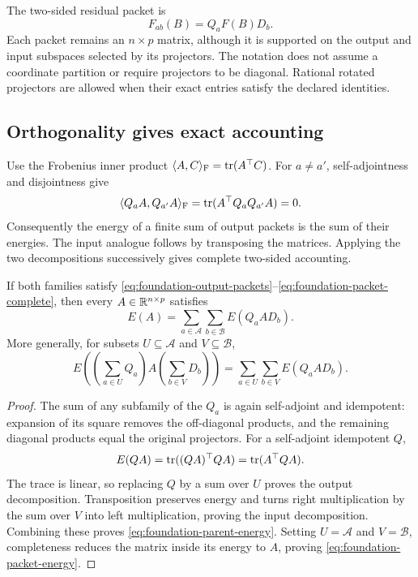 The two-sided residual packet is
\begin{equation}
 F_{ab}(B)=Q_aF(B)D_b.
 \label{eq:foundation-packet-residual}
\end{equation}
Each packet remains an $n\times p$ matrix, although it is supported on the output and input subspaces selected by its projectors. The notation does not assume a coordinate partition or require projectors to be diagonal. Rational rotated projectors are allowed when their exact entries satisfy the declared identities.

\subsection{Orthogonality gives exact accounting}

Use the Frobenius inner product $\langle A,C\rangle_{\mathrm F}=\operatorname{tr}(A^\top C)$. For $a\ne a'$, self-adjointness and disjointness give
\[
 \langle Q_aA,Q_{a'}A\rangle_{\mathrm F}
 =\operatorname{tr}(A^\top Q_aQ_{a'}A)=0.
\]
Consequently the energy of a finite sum of output packets is the sum of their energies. The input analogue follows by transposing the matrices. Applying the two decompositions successively gives complete two-sided accounting.

\begin{theorem}
\label{thm:foundation-packet-energy}
If both families satisfy \eqref{eq:foundation-output-packets}--\eqref{eq:foundation-packet-complete}, then every $A\in\mathbb R^{n\times p}$ satisfies
\begin{equation}
 E(A)=\sum_{a\in\mathcal A}\sum_{b\in\mathcal B}E(Q_aAD_b).
 \label{eq:foundation-packet-energy}
\end{equation}
More generally, for subsets $U\subseteq\mathcal A$ and $V\subseteq\mathcal B$,
\begin{equation}
 E\!\left(\left(\sum_{a\in U}Q_a\right)A
             \left(\sum_{b\in V}D_b\right)\right)
 =\sum_{a\in U}\sum_{b\in V}E(Q_aAD_b).
 \label{eq:foundation-parent-energy}
\end{equation}
\end{theorem}
\begin{proof}
The sum of any subfamily of the $Q_a$ is again self-adjoint and idempotent: expansion of its square removes the off-diagonal products, and the remaining diagonal products equal the original projectors. For a self-adjoint idempotent $Q$,
\[
 E(QA)=\operatorname{tr}((QA)^\top QA)=\operatorname{tr}(A^\top QA).
\]
The trace is linear, so replacing $Q$ by a sum over $U$ proves the output decomposition. Transposition preserves energy and turns right multiplication by the sum over $V$ into left multiplication, proving the input decomposition. Combining these proves \eqref{eq:foundation-parent-energy}. Setting $U=\mathcal A$ and $V=\mathcal B$, completeness reduces the matrix inside its energy to $A$, proving \eqref{eq:foundation-packet-energy}.
\end{proof}


